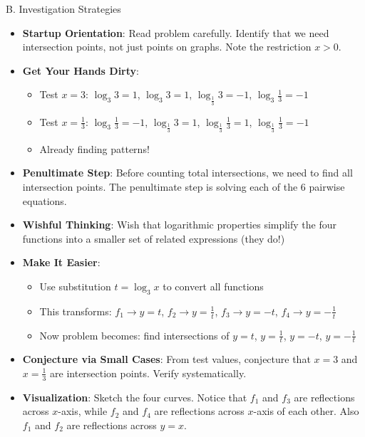 \documentclass[12pt]{article}
\begin{document}
\begin{strategicbox}{B. Investigation Strategies}
\begin{itemize}[leftmargin=*]
    \item \textbf{Startup Orientation}: Read problem carefully. Identify that we need intersection points, not just points on graphs. Note the restriction $x > 0$.
    
    \item \textbf{Get Your Hands Dirty}: 
    \begin{itemize}
        \item Test $x = 3$: $\log_3 3 = 1$, $\log_3 3 = 1$, $\log_{\frac{1}{3}} 3 = -1$, $\log_3 \frac{1}{3} = -1$
        \item Test $x = \frac{1}{3}$: $\log_3 \frac{1}{3} = -1$, $\log_{\frac{1}{3}} 3 = 1$, $\log_{\frac{1}{3}} \frac{1}{3} = 1$, $\log_{\frac{1}{3}} \frac{1}{3} = -1$
        \item Already finding patterns!
    \end{itemize}
    
    \item \textbf{Penultimate Step}: Before counting total intersections, we need to find all intersection points. The penultimate step is solving each of the 6 pairwise equations.
    
    \item \textbf{Wishful Thinking}: Wish that logarithmic properties simplify the four functions into a smaller set of related expressions (they do!)
    
    \item \textbf{Make It Easier}: 
    \begin{itemize}
        \item Use substitution $t = \log_3 x$ to convert all functions
        \item This transforms: $f_1 \to y = t$, $f_2 \to y = \frac{1}{t}$, $f_3 \to y = -t$, $f_4 \to y = -\frac{1}{t}$
        \item Now problem becomes: find intersections of $y = t$, $y = \frac{1}{t}$, $y = -t$, $y = -\frac{1}{t}$
    \end{itemize}
    
    \item \textbf{Conjecture via Small Cases}: From test values, conjecture that $x = 3$ and $x = \frac{1}{3}$ are intersection points. Verify systematically.
    
    \item \textbf{Visualization}: Sketch the four curves. Notice that $f_1$ and $f_3$ are reflections across $x$-axis, while $f_2$ and $f_4$ are reflections across $x$-axis of each other. Also $f_1$ and $f_2$ are reflections across $y = x$.
\end{itemize}
\end{strategicbox}
\end{document}
